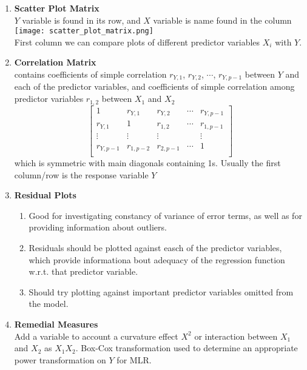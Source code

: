\documentclass[11pt]{article}
\begin{document}
\begin{enumerate}
    \item \textbf{Scatter Plot Matrix} \\
    $Y$ variable is found in its row, and $X$ variable is name found in the column \\ 
    \texttt{[image: scatter\_plot\_matrix.png]} \\
    First column we can compare plots of different predictor variables $X_i$ with $Y$. 
    \item \textbf{Correlation Matrix} \\
    contains coefficients of simple correlation $r_{Y,1}$, $r_{Y,2}$, $\cdots$, $r_{Y,p-1}$ between $Y$ and each of the predictor variables, and coefficients of simple correlation among predictor variables $r_{1,2}$ between $X_1$ and $X_2$
    \[
        \begin{bmatrix}
            1 & r_{Y,1} & r_{Y,2} & \cdots & r_{Y,p-1} \\ 
            r_{Y,1} & 1 & r_{1,2} & \cdots & r_{1,p-1} \\ 
            \vdots & \vdots & \vdots & & \vdots \\
            r_{Y,p-1} & r_{1,p-2} & r_{2,p-1} & \cdots & 1 \\ 
        \end{bmatrix}    
    \]
    which is symmetric with main diagonals containing 1s. Usually the first column/row is the response variable $Y$
    \item \textbf{Residual Plots} \\
    \begin{enumerate}
        \item Good for investigating constancy of variance of error terms, as well as for providing information about outliers.
        \item Residuals should be plotted against easch of the predictor variables, which provide informationa bout adequacy of the regression function w.r.t. that predictor variable.
        \item Should try plotting against important predictor variables omitted from the model.
    \end{enumerate}
    \item \textbf{Remedial Measures} \\
    Add a variable to account a curvature effect $X^2$ or interaction between $X_1$ and $X_2$ as $X_1 X_2$. Box-Cox transformation used to determine an appropriate power transformation on $Y$ for MLR. 
     
\end{enumerate}
\end{document}
